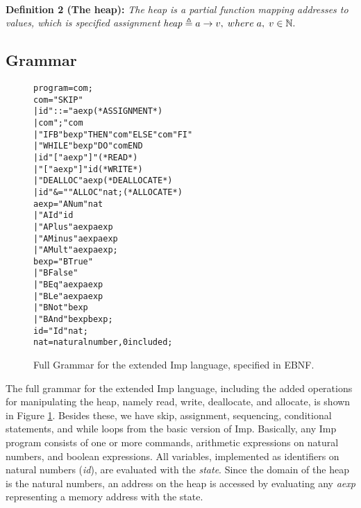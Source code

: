 \paragraph{}
\textbf{Definition 2 (The heap):} \textit{The heap is a partial function mapping addresses to values, which is specified assignment} $\mathit{heap} \mathrel{\triangleq} a\to v, \; where\; a, \;v \in \mathbb{N}.$

\subsection{Grammar}

\begin{figure}
\begin{alltt}
                  program = com ;
                  com =   "SKIP"
                        | id "::=" aexp            (* ASSIGNMENT *)
                        | com ";" com
                        | "IFB" bexp "THEN" com "ELSE" com "FI"
                        | "WHILE" bexp "DO" com END
                        | id \lsquigarr "[" aexp "]"       (* READ *)
                        | "[" aexp "]" \lsquigarr id       (* WRITE *)
                        | "DEALLOC" aexp           (* DEALLOCATE *)
                        | id "&=" "ALLOC" nat ;    (* ALLOCATE *)
                  aexp =  "ANum" nat
                        | "AId" id
                        | "APlus" aexp aexp
                        | "AMinus" aexp aexp
                        | "AMult" aexp aexp ;
                  bexp =  "BTrue"
                        | "BFalse"
                        | "BEq" aexp aexp
                        | "BLe" aexp aexp
                        | "BNot" bexp
                        | "BAnd" bexp bexp ;
                  id = "Id" nat ;
                  nat = natural number, 0 included ;
\end{alltt}
\caption{Full Grammar for the extended Imp language, specified in EBNF.}
\label{fig:imp_grammar}
\end{figure}

The full grammar for the extended Imp language, including the added operations for manipulating the heap, namely read, write, deallocate, and allocate, is shown in Figure \ref{fig:imp_grammar}. Besides these, we have skip, assignment, sequencing, conditional statements, and while loops from the basic version of Imp. Basically, any Imp program consists of one or more commands, arithmetic expressions on natural numbers, and boolean expressions. All variables, implemented as identifiers on natural numbers ({\it id}), are evaluated with the {\it state}. Since the domain of the heap is the natural numbers, an address on the heap is accessed by evaluating any {\it aexp} representing a memory address with the state.

